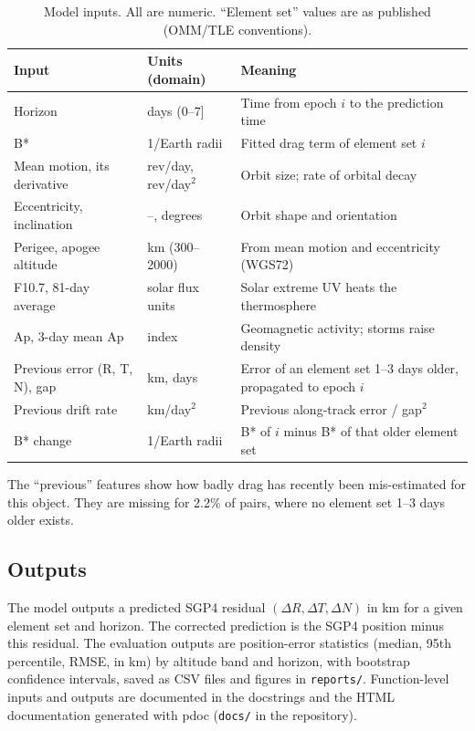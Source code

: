 \documentclass[11pt, a4paper]{article}
\begin{document}
\begin{table}[htbp]
\centering
\small
\captionsetup{width=0.8\linewidth}
\caption{Model inputs. All are numeric. ``Element set'' values are as published (OMM/TLE conventions).}
\label{tab:inputs}
\begin{tabular}{L{3.6cm}L{2.6cm}L{7.6cm}}
\toprule
Input & Units (domain) & Meaning \\
\midrule
Horizon & days (0--7] & Time from epoch $i$ to the prediction time \\
B* & 1/Earth radii & Fitted drag term of element set $i$ \\
Mean motion, its derivative & rev/day, rev/day$^2$ & Orbit size; rate of orbital decay \\
Eccentricity, inclination & --, degrees & Orbit shape and orientation \\
Perigee, apogee altitude & km (300--2000) & From mean motion and eccentricity (WGS72) \\
F10.7, 81-day average & solar flux units & Solar extreme UV heats the thermosphere \\
Ap, 3-day mean Ap & index & Geomagnetic activity; storms raise density \\
Previous error (R, T, N), gap & km, days & Error of an element set 1--3 days older, propagated to epoch $i$ \\
Previous drift rate & km/day$^2$ & Previous along-track error / gap$^2$ \\
B* change & 1/Earth radii & B* of $i$ minus B* of that older element set \\
\bottomrule
\end{tabular}
\end{table}

The ``previous'' features show how badly drag has recently been mis-estimated for this object. They are missing for 2.2\% of pairs, where no element set 1--3 days older exists.

\subsection{Outputs}

The model outputs a predicted SGP4 residual $(\Delta R, \Delta T, \Delta N)$ in km for a given element set and horizon. The corrected prediction is the SGP4 position minus this residual. The evaluation outputs are position-error statistics (median, 95th percentile, RMSE, in km) by altitude band and horizon, with bootstrap confidence intervals, saved as CSV files and figures in \texttt{reports/}. Function-level inputs and outputs are documented in the docstrings and the HTML documentation generated with pdoc (\texttt{docs/} in the repository).
\end{document}
